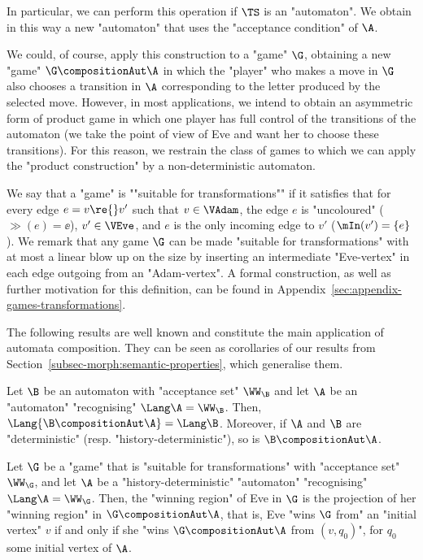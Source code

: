 \documentclass{theoretics}
\begin{document}
In particular, we can perform this operation if $\TS$ is an "automaton". We obtain in this way a new "automaton" that uses the "acceptance condition" of $\A$. %


We could, of course, apply this construction to a "game" $\G$, obtaining a new "game" $\G\compositionAut \A$ in which the "player" who makes a move in $\G$ also chooses a transition in $\A$ corresponding to the letter produced by the selected move. However, in most applications, we intend to obtain an asymmetric form of product game in which one player has full control of the transitions of the automaton (we take the point of view of Eve and want her to choose these transitions). For this reason, we restrain the class of games to which we can apply the "product construction" by a non-deterministic automaton. 

\AP We say that a "game" is ""suitable for transformations"" if it satisfies that for every edge $e = v\re{}v'$ such that $v\in \VAdam$, the edge $e$ is "uncoloured" ($\gg(e)=\ee$), $v'\in \VEve$, and $e$ is the only incoming edge to $v'$ ($\mIn(v') = \{e\}$). 
We remark that any game $\G$ can be made "suitable for transformations" with at most a linear blow up on the size by inserting an intermediate "Eve-vertex" in each edge outgoing from an "Adam-vertex". A formal construction, as well as further motivation for this definition, can be found in Appendix~\ref{sec:appendix-games-transformations}. 




The following results are well known and constitute the main application of automata composition. They can be seen as corollaries of our results from Section~\ref{subsec-morph:semantic-properties}, which generalise them.

\begin{proposition}[Folklore]\label{prop-prelim:composition_automata}
	Let $\B$ be an automaton with "acceptance set" $\WW_{\B}$  and let $\A$ be an "automaton" "recognising" $\Lang \A=\WW_{\B}$. Then, $\Lang{ \B \compositionAut \A}=\Lang \B$.
	Moreover, if $\A$ and $\B$ are "deterministic" (resp. "history-deterministic"), so is $\B \compositionAut \A$.
\end{proposition}

\begin{proposition}[\cite{HP06}]\label{prop-prelim:composition_games_HD}
	Let $\G$ be a "game" that is "suitable for transformations" with "acceptance set" $\WW_\G$, and let $\A$ be a "history-deterministic" "automaton" "recognising" $\Lang \A=\WW_{\G}$. Then, the "winning region" of Eve in $\G$ is the projection of her "winning region" in $\G\compositionAut \A$, that is, Eve "wins $\G$ from" an "initial vertex" $v$ if and only if she "wins $\G\compositionAut \A$ from $(v, q_0)$", for $q_0$  some initial vertex of $\A$. 
\end{proposition}
\end{document}
